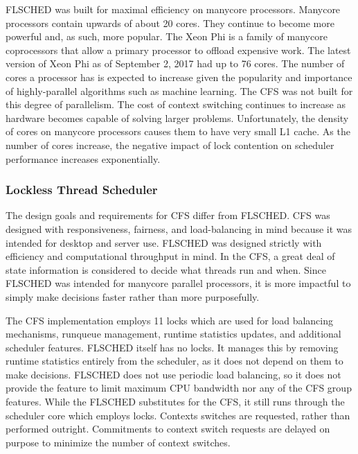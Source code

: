 \documentclass{sig-alternate}
\begin{document}
FLSCHED was built for maximal efficiency on manycore processors. Manycore processors contain upwards of about 20 cores. They continue to become more powerful and, as such, more popular. The Xeon Phi is a family of manycore coprocessors that allow a primary processor to offload expensive work. The latest version of Xeon Phi as of September 2, 2017 had up to 76 cores. The number of cores a processor has is expected to increase given the popularity and importance of highly-parallel algorithms such as machine learning. The CFS was not built for this degree of parallelism. The cost of context switching continues to increase as hardware becomes capable of solving larger problems. Unfortunately, the density of cores on manycore processors causes them to have very small L1 cache. As the number of cores increase, the negative impact of lock contention on scheduler performance increases exponentially.


\subsubsection{Lockless Thread Scheduler}
\label{sec:flsched_about}

The design goals and requirements for CFS differ from FLSCHED. CFS was designed with responsiveness, fairness, and load-balancing in mind because it was intended for desktop and server use. FLSCHED was designed strictly with efficiency and computational throughput in mind. In the CFS, a great deal of state information is considered to decide what threads run and when. Since FLSCHED was intended for manycore parallel processors, it is more impactful to simply make decisions faster rather than more purposefully.~\cite{Jo:2017}

The CFS implementation employs 11 locks which are used for load balancing mechanisms, runqueue management, runtime statistics updates, and additional scheduler features. FLSCHED itself has no locks. It manages this by removing runtime statistics entirely from the scheduler, as it does not depend on them to make decisions. FLSCHED does not use periodic load balancing, so it does not provide the feature to limit maximum CPU bandwidth nor any of the CFS group features. While the FLSCHED substitutes for the CFS, it still runs through the scheduler core which employs locks. Contexts switches are requested, rather than performed outright. Commitments to context switch requests are delayed on purpose to minimize the number of context switches.~\cite{Jo:2017}
\end{document}
